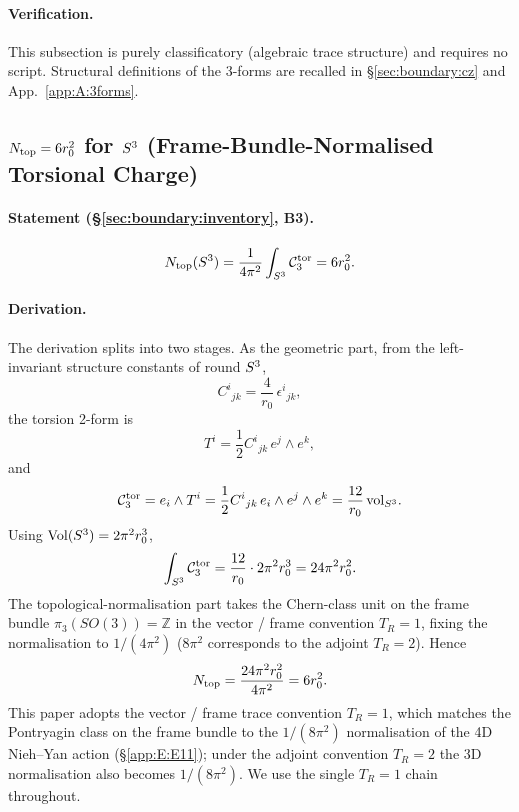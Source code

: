 \paragraph{Verification.}
This subsection is purely classificatory (algebraic trace structure) and
requires no script.  Structural definitions of the 3-forms are recalled in
\S\ref{sec:boundary:cz} and App.~\ref{app:A:3forms}.

\subsection{$N_{\mathrm{top}} = 6 r_0^2$ for $S^3$ (Frame-Bundle-Normalised
Torsional Charge)}
\label{app:E:E9}

\paragraph{Statement (\S\ref{sec:boundary:inventory}, B3).}
\begin{equation}
  N_{\mathrm{top}}(S^3) = \frac{1}{4\pi^2}\int_{S^3}\mathcal{C}_3^{\mathrm{tor}} = 6 r_0^2.
\end{equation}

\paragraph{Derivation.}
The derivation splits into two stages.  As the geometric part, from the
left-invariant structure constants of round $S^3$,
\begin{equation}
  C^i{}_{jk} = \frac{4}{r_0}\,\epsilon^i{}_{jk},
\end{equation}
the torsion 2-form is
\begin{equation}
  T^i = \frac{1}{2}C^i{}_{jk}\,e^j\wedge e^k,
\end{equation}
and
\begin{equation}
  \mathcal{C}_3^{\mathrm{tor}} = e_i\wedge T^i
        = \frac{1}{2}C^i{}_{jk}\,e_i\wedge e^j\wedge e^k
        = \frac{12}{r_0}\,\mathrm{vol}_{S^3}.
\end{equation}
Using $\mathrm{Vol}(S^3) = 2\pi^2 r_0^3$,
\begin{equation}
  \int_{S^3}\mathcal{C}_3^{\mathrm{tor}} = \frac{12}{r_0}\cdot 2\pi^2 r_0^3 = 24\pi^2 r_0^2.
\end{equation}
The topological-normalisation part takes the Chern-class unit on the frame
bundle $\pi_3(SO(3)) = \mathbb{Z}$ in the vector / frame convention
$T_R = 1$, fixing the normalisation to $1/(4\pi^2)$ ($8\pi^2$ corresponds to
the adjoint $T_R = 2$).  Hence
\begin{equation}
  N_{\mathrm{top}} = \frac{24\pi^2 r_0^2}{4\pi^2} = 6 r_0^2.
\end{equation}
This paper adopts the vector / frame trace convention $T_R = 1$, which
matches the Pontryagin class on the frame bundle to the $1/(8\pi^2)$
normalisation of the 4D Nieh--Yan action (\S\ref{app:E:E11}); under the
adjoint convention $T_R = 2$ the 3D normalisation also becomes
$1/(8\pi^2)$.  We use the single $T_R = 1$ chain throughout.

